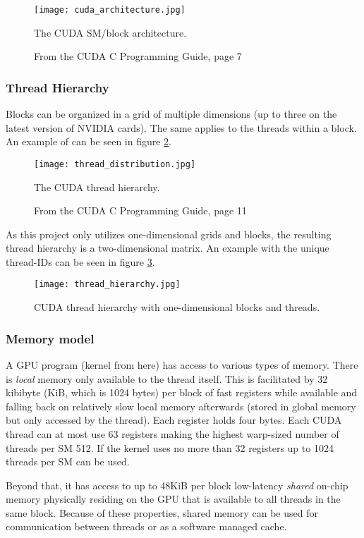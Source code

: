 \begin{figure}[H]\centering
\texttt{[image: cuda\_architecture.jpg]}
\caption{The CUDA SM/block architecture.\label{cuda_architecture}}
\caption*{From the CUDA C Programming Guide, page 7 \cite{nvidia2014programming}}
\end{figure}

\subsubsection{Thread Hierarchy}
Blocks can be organized in a grid of multiple dimensions (up to three on the latest version of NVIDIA cards). 
The same applies to the threads within a block.
An example of can be seen in figure \ref{thread_distribution}.

\begin{figure}[h!]\centering
\texttt{[image: thread\_distribution.jpg]}
\caption{The CUDA thread hierarchy.\label{thread_distribution}}
\caption*{From the CUDA C Programming Guide, page 11 \cite{nvidia2014programming}}
\end{figure}

As this project only utilizes one-dimensional grids and blocks, the resulting thread hierarchy is a two-dimensional matrix. 
An example with the unique thread-IDs can be seen in figure \ref{thread_hierarchy}.

\begin{figure}[h!]\centering
\texttt{[image: thread\_hierarchy.jpg]}
\caption{CUDA thread hierarchy with one-dimensional blocks and threads.\label{thread_hierarchy}}
\end{figure}


\subsubsection{Memory model}
A GPU program (kernel from here) has access to various types of memory.
There is \emph{local} memory only available to the thread itself.
This is facilitated by 32 kibibyte (KiB, which is 1024 bytes) per block of fast registers while available and falling back on relatively slow local memory afterwards (stored in global memory but only accessed by the thread).
Each register holds four bytes.
Each CUDA thread can at most use 63 registers making the highest warp-sized number of threads per SM 512.
If the kernel uses no more than 32 registers up to 1024 threads per SM can be used.

Beyond that, it has access to up to 48KiB per block low-latency \emph{shared} on-chip memory physically residing on the GPU that is available to all threads in the same block. 
Because of these properties, shared memory can be used for communication between threads or as a software managed cache.

